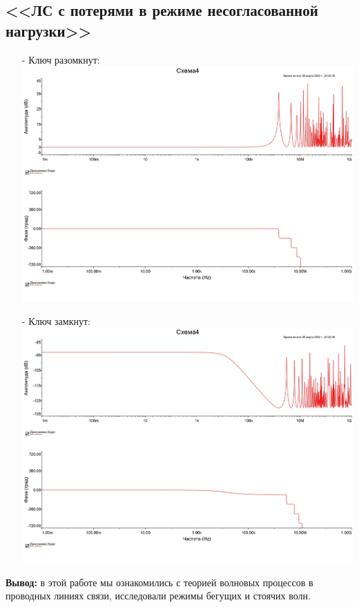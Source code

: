 \documentclass[11pt]{article}
\begin{document}
\subsection{<<ЛС с потерями в режиме несогласованной нагрузки>>}
\begin{itemize}
    \item[-] Ключ разомкнут:\\
        \includegraphics[width=1\linewidth]{4/4open.jpg}
    \item[-] Ключ замкнут:\\
        \includegraphics[width=1\linewidth]{4/4close.jpg}
\end{itemize}
\textbf{Вывод:} в этой работе мы ознакомились с теорией волновых процессов в проводных линиях связи, исследовали режимы бегущих и стоячих волн.
\end{document}
